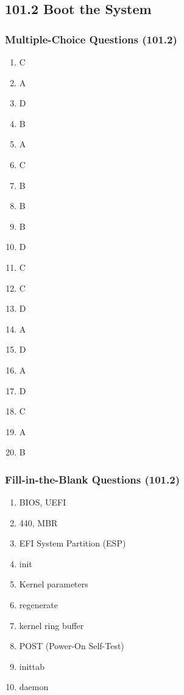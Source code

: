 \documentclass[12pt,a4paper]{report}
\begin{document}
    \subsection*{101.2 Boot the System}
    \subsubsection*{Multiple-Choice Questions (101.2)}
\begin{enumerate}[1.]
    \item C
    \item A
    \item D
    \item B
    \item A
    \item C
    \item B
    \item B
    \item B
    \item D
    \item C
    \item C
    \item D
    \item A
    \item D
    \item A
    \item D
    \item C
    \item A
    \item B
    \end{enumerate}

\subsubsection*{Fill-in-the-Blank Questions (101.2)}
\begin{enumerate}[1.]
    \item BIOS, UEFI
    \item 440, MBR
    \item EFI System Partition (ESP)
    \item init
    \item Kernel parameters
    \item regenerate
    \item kernel ring buffer
    \item POST (Power-On Self-Test)
    \item inittab
    \item daemon
    \end{enumerate}
\end{document}
